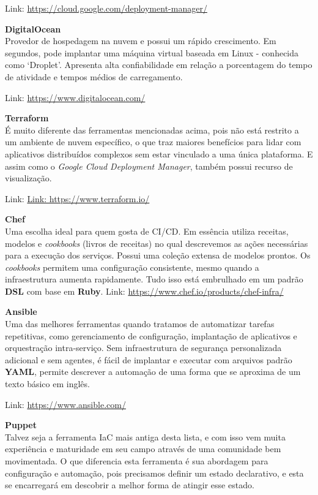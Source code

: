 \documentclass[fleqn,10pt]{../sty/SelfArx} %
\begin{document}
Link: \url{https://cloud.google.com/deployment-manager/}

\textbf{DigitalOcean} \\
Provedor de hospedagem na nuvem e possui um rápido crescimento. Em segundos, pode implantar uma máquina virtual baseada em Linux - conhecida como ‘Droplet’. Apresenta alta confiabilidade em relação a porcentagem do tempo de atividade e tempos médios de carregamento.

Link: \url{https://www.digitalocean.com/}

\textbf{Terraform} \\
É muito diferente das ferramentas mencionadas acima, pois não está restrito a um ambiente de nuvem específico, o que traz maiores benefícios para lidar com aplicativos distribuídos complexos sem estar vinculado a uma única plataforma. E assim como o \textit{Google Cloud Deployment Manager}, também possui recurso de visualização.

Link: \url{Link: https://www.terraform.io/}

\textbf{Chef} \\
Uma escolha ideal para quem gosta de CI/CD. Em essência utiliza receitas, modelos e \textit{cookbooks} (livros de receitas) no qual descrevemos as ações necessárias para a execução dos serviços. Possui uma coleção extensa de modelos prontos. Os \textit{cookbooks} permitem uma configuração consistente, mesmo quando a infraestrutura aumenta rapidamente. Tudo isso está embrulhado em um padrão \textbf{DSL} com base em \textbf{Ruby}.
Link: \url{https://www.chef.io/products/chef-infra/}

\textbf{Ansible} \\
Uma das melhores ferramentas quando tratamos de automatizar tarefas repetitivas, como gerenciamento de configuração, implantação de aplicativos e orquestração intra-serviço. Sem infraestrutura de segurança personalizada adicional e sem agentes, é fácil de implantar e executar com arquivos padrão \textbf{YAML}, permite descrever a automação de uma forma que se aproxima de um texto básico em inglês.

Link: \url{https://www.ansible.com/}

\textbf{Puppet} \\
Talvez seja a ferramenta IaC mais antiga desta lista, e com isso vem muita experiência e maturidade em seu campo através de uma comunidade bem movimentada. O que diferencia esta ferramenta é sua abordagem para configuração e automação, pois precisamos definir um estado declarativo, e esta se encarregará em descobrir a melhor forma de atingir esse estado.
\end{document}

